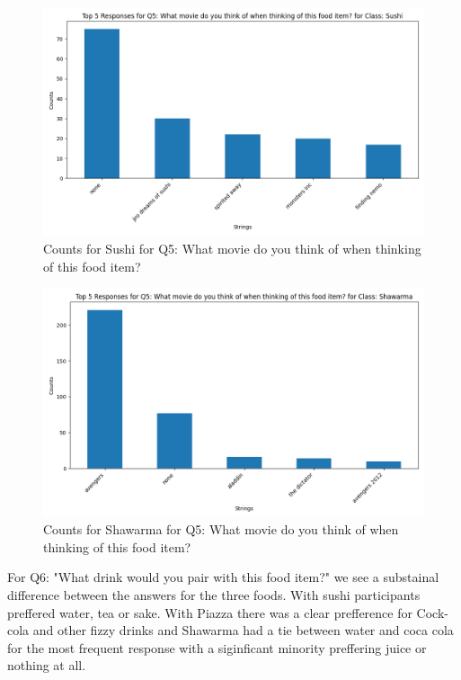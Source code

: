 \begin{figure}[ht]
    \centerline{\includegraphics[width=\columnwidth]{data/top_5_responses_Q5_Sushi.png}}
    \caption{Counts for Sushi for Q5: What movie do you think of when thinking of this food item?}
    \label{f:sushi_q5}
\end{figure}
\begin{figure}[ht]
    \centerline{\includegraphics[width=\columnwidth]{data/top_5_responses_Q5_Shawarma.png}}
    \caption{Counts for Shawarma for Q5: What movie do you think of when thinking of this food item?}
    \label{f:shawarma_q6}
\end{figure}


For Q6: "What drink would you pair with this food item?" we see a substainal difference between the answers for the three foods.
With sushi participants preffered water, tea or sake. With Piazza there was a clear prefference for Cock-cola and other fizzy drinks
and Shawarma had a tie between water and coca cola for the most frequent response with a siginficant minority preffering juice or
nothing at all.

